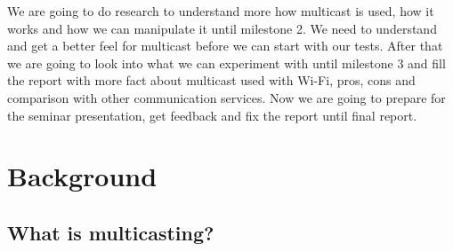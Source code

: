 \documentclass[9pt,a4paper]{acmproc}
\begin{document}
We are going to do research to understand more how multicast is used, how it works and how we can manipulate it until milestone 2. We need to understand and get a better feel for multicast before we can start with our tests. After that we are going to look into what we can experiment with until milestone 3 and fill the report with more fact about multicast used with Wi-Fi, pros, cons and comparison with other communication services. Now we are going to prepare for the seminar presentation, get feedback and fix the report until final report.

\newpage

\section{Background}

\subsection{What is multicasting?}
\end{document}
